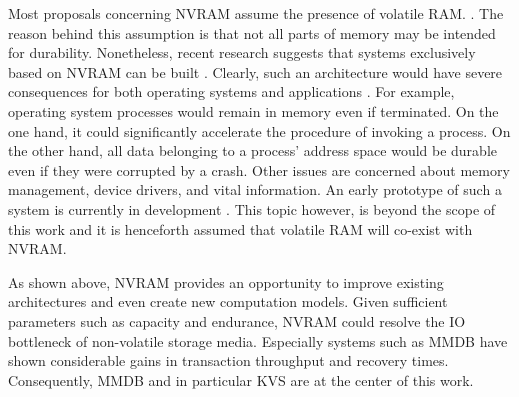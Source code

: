 Most proposals concerning NVRAM assume the presence of volatile RAM.
\cite{oukid2017data}. The reason behind this assumption is that not all parts of
memory may be intended for durability. Nonetheless, recent research suggests
that systems exclusively based on NVRAM can be built \cite{narayanan2012whole,
courtland2016can}. Clearly, such an architecture would have severe consequences
for both operating systems and applications \cite{bailey2011operating}. For
example, operating system processes would remain in memory even if terminated.
On the one hand, it could significantly accelerate the procedure of invoking a
process. On the other hand, all data belonging to a process' address space would
be durable even if they were corrupted by a crash. Other issues are concerned
about memory management, device drivers, and vital information. An early
prototype of such a system is currently in development \cite{courtland2016can}.
This topic however, is beyond the scope of this work and it is henceforth
assumed that volatile RAM will co-exist with NVRAM.

As shown above, NVRAM provides an opportunity to improve existing architectures
and even create new computation models. Given sufficient parameters such as
capacity and endurance, NVRAM could resolve the IO bottleneck of non-volatile
storage media. Especially systems such as MMDB have shown considerable gains in
transaction throughput and recovery times. Consequently, MMDB and in particular
KVS are at the center of this work.
